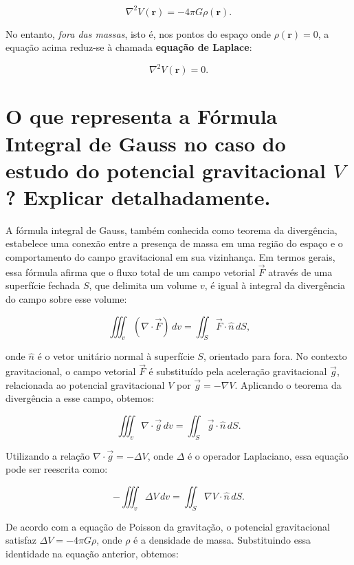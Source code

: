 \[
\nabla^2 V(\mathbf{r}) = -4\pi G \rho(\mathbf{r}) \text{.}
\]

No entanto, \textit{fora das massas}, isto é, nos pontos do espaço onde \( \rho(\mathbf{r}) = 0 \), a equação acima reduz-se à chamada \textbf{equação de Laplace}:

\[
\nabla^2 V(\mathbf{r}) = 0 \text{.}
\]



\section{O que representa a Fórmula Integral de Gauss no caso do estudo do potencial gravitacional $V$? Explicar detalhadamente.}


A fórmula integral de Gauss, também conhecida como teorema da divergência, estabelece uma conexão entre a presença de massa em uma região do espaço e o comportamento do campo gravitacional em sua vizinhança. Em termos gerais, essa fórmula afirma que o fluxo total de um campo vetorial \( \vec{F} \) através de uma superfície fechada \( S \), que delimita um volume \( v \), é igual à integral da divergência do campo sobre esse volume:

\[
\iiint_v (\nabla \cdot \vec{F}) \, dv = \iint_S \vec{F} \cdot \hat{n} \, dS \text{,}
\]

\noindent
onde \( \hat{n} \) é o vetor unitário normal à superfície \( S \), orientado para fora. No contexto gravitacional, o campo vetorial \( \vec{F} \) é substituído pela aceleração gravitacional \( \vec{g} \), relacionada ao potencial gravitacional \( V \) por \( \vec{g} = -\nabla V \). Aplicando o teorema da divergência a esse campo, obtemos:

\[
\iiint_v \nabla \cdot \vec{g} \, dv = \iint_S \vec{g} \cdot \hat{n} \, dS \text{.}
\]

\noindent
Utilizando a relação \( \nabla \cdot \vec{g} = -\Delta V \), onde \( \Delta \) é o operador Laplaciano, essa equação pode ser reescrita como:

\[
-\iiint_v \Delta V \, dv = \iint_S \nabla V \cdot \hat{n} \, dS \text{.}
\]

\noindent
De acordo com a equação de Poisson da gravitação, o potencial gravitacional satisfaz \( \Delta V = -4\pi G \rho \), onde \( \rho \) é a densidade de massa. Substituindo essa identidade na equação anterior, obtemos:

